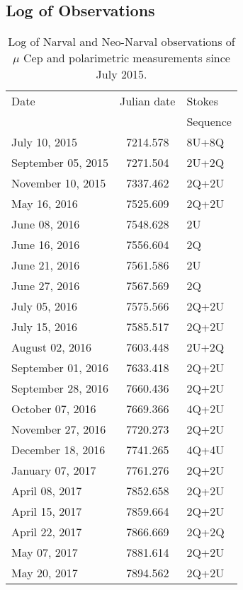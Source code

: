 \documentclass{/Users/art2/TeX/aanda/aa}
\begin{document}

%



 \begin{appendix}
 

 \section{Log of Observations}


 \begin{table} [h]
 \caption{Log of Narval  and Neo-Narval  observations of $\mu$ Cep and polarimetric measurements since July 2015.}
 \begin{tabular}{lcl}%

\hline 
\hline
Date &  Julian date & Stokes \\
&&Sequence \\
 \hline
July 10, 2015 & 7214.578 & 8U+8Q \\
September 05, 2015 & 7271.504 & 2U+2Q \\
November 10, 2015 & 7337.462 & 2Q+2U \\
May 16, 2016 & 7525.609 & 2Q+2U \\
June 08, 2016 & 7548.628 & 2U \\
June 16, 2016 & 7556.604 & 2Q \\
June 21, 2016 & 7561.586 & 2U \\
June 27, 2016 & 7567.569 & 2Q \\
July 05, 2016 & 7575.566 & 2Q+2U \\
July 15, 2016 & 7585.517 & 2Q+2U \\
August 02, 2016 & 7603.448 & 2U+2Q \\
September 01, 2016 & 7633.418 & 2Q+2U \\
September 28, 2016 & 7660.436 & 2Q+2U \\
October 07, 2016 & 7669.366 & 4Q+2U \\
November 27, 2016 & 7720.273 & 2Q+2U \\
December 18, 2016 & 7741.265 & 4Q+4U \\
January 07, 2017 & 7761.276 & 2Q+2U \\
April 08, 2017 & 7852.658 & 2Q+2U \\
April 15, 2017 & 7859.664 & 2Q+2U \\
April 22, 2017 & 7866.669 & 2Q+2Q \\
May 07, 2017 & 7881.614 & 2Q+2U \\
May 20, 2017 & 7894.562 & 2Q+2U \\


\end{tabular}
\end{table}
\end{appendix}
\end{document}
